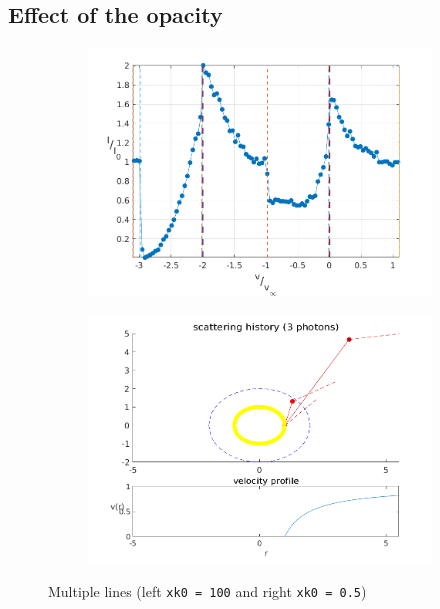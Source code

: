 \documentclass[../main/main.tex]{subfiles}
\begin{document}
\subsection{Effect of the opacity}
	\begin{figure}[H]
	\centering	
	\hspace*{-0.5in}
	\begin{subfigure}{.6\textwidth}
	\includegraphics[width=1\textwidth]{../../two_resonance_lines/figures/multiple_lines_distant_diff_opacity.png}
	\end{subfigure}%
	\begin{subfigure}{.6\textwidth}
	\includegraphics[width=1\textwidth]{../../two_resonance_lines/figures/multiple_lines_photon_path_distant_diff_opacity.png}
	\end{subfigure}
	\caption{Multiple lines (left \texttt{xk0 = 100} and right \texttt{xk0 = 0.5})}
	\label{multiple_lines_1_effect_opacity}
	\end{figure}
\end{document}
